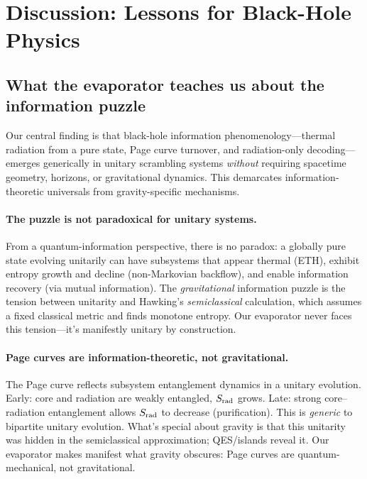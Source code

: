 \documentclass[aps,prx,onecolumn,showpacs,superscriptaddress,longbibliography,nofootinbib]{revtex4-2}
\begin{document}
\section{Discussion: Lessons for Black-Hole Physics}

\subsection{What the evaporator teaches us about the information puzzle}

Our central finding is that black-hole information phenomenology---thermal radiation from a pure state, Page curve turnover, and radiation-only decoding---emerges generically in unitary scrambling systems \emph{without} requiring spacetime geometry, horizons, or gravitational dynamics. This demarcates information-theoretic universals from gravity-specific mechanisms.

\paragraph{The puzzle is not paradoxical for unitary systems.}
From a quantum-information perspective, there is no paradox: a globally pure state evolving unitarily can have subsystems that appear thermal (ETH), exhibit entropy growth and decline (non-Markovian backflow), and enable information recovery (via mutual information). The \emph{gravitational} information puzzle is the tension between unitarity and Hawking's \emph{semiclassical} calculation, which assumes a fixed classical metric and finds monotone entropy. Our evaporator never faces this tension---it's manifestly unitary by construction.

\paragraph{Page curves are information-theoretic, not gravitational.}
The Page curve reflects subsystem entanglement dynamics in a unitary evolution. Early: core and radiation are weakly entangled, $S_{\rm rad}$ grows. Late: strong core--radiation entanglement allows $S_{\rm rad}$ to decrease (purification). This is \emph{generic} to bipartite unitary evolution. What's special about gravity is that this unitarity was hidden in the semiclassical approximation; QES/islands reveal it. Our evaporator makes manifest what gravity obscures: Page curves are quantum-mechanical, not gravitational.
\end{document}
